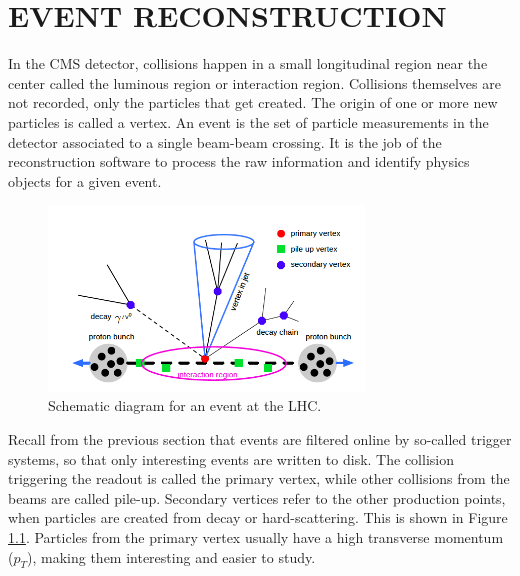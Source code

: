 %
%
%
%



\chapter{EVENT RECONSTRUCTION \label{cha:eventreco}}
In the CMS detector, collisions happen in a small longitudinal region near the center called the luminous region or interaction region. Collisions themselves are not recorded, only the particles that get created. The origin of one or more new particles is called a vertex. An event is the set of particle measurements in the detector associated to a single beam-beam crossing. It is the job of the reconstruction software to process the raw information and identify physics objects for a given event.

 \begin{figure}[H]
 	\centering
 	\includegraphics[width=0.75\textwidth]{figures/eventvertex.png}
 	\singlespace
 	\caption{Schematic diagram for an event at the LHC.}
 	\label{fig:vertex}
 \end{figure}

Recall from the previous section that events are filtered online by so-called trigger systems, so that only interesting events are written to disk. The collision triggering the readout is called the primary vertex, while other collisions from the beams are called pile-up. Secondary vertices refer to the other production points, when particles are created from decay or hard-scattering. This is shown in Figure \ref{fig:vertex}. Particles from the primary vertex usually have a high transverse momentum ($p_{T}$), making them interesting and easier to study.



